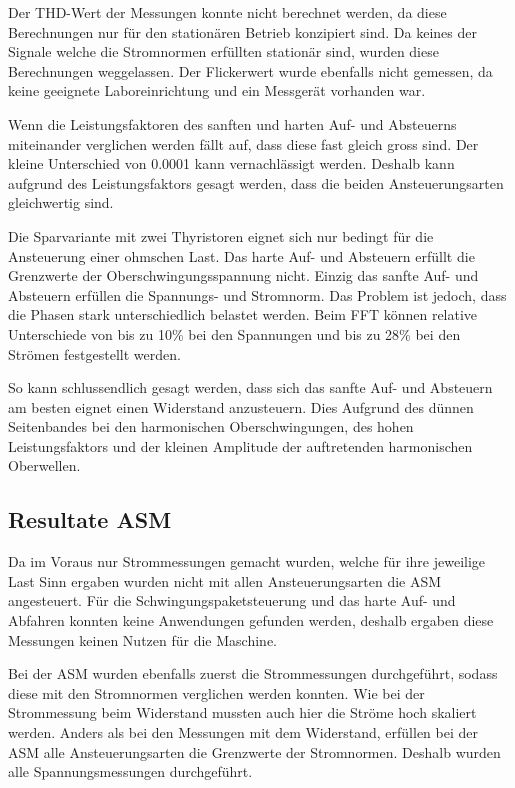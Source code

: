 Der THD-Wert der Messungen konnte nicht berechnet werden, da diese Berechnungen nur für den stationären Betrieb konzipiert sind. Da keines der Signale welche die Stromnormen erfüllten stationär sind, wurden diese Berechnungen weggelassen. Der Flickerwert wurde ebenfalls nicht gemessen, da keine geeignete Laboreinrichtung und ein Messgerät vorhanden war.

Wenn die Leistungsfaktoren des sanften und harten Auf- und Absteuerns miteinander verglichen werden fällt auf, dass diese fast gleich gross sind. Der kleine Unterschied von 0.0001 kann vernachlässigt werden. Deshalb kann aufgrund des Leistungsfaktors gesagt werden, dass die beiden Ansteuerungsarten gleichwertig sind.

Die Sparvariante mit zwei Thyristoren eignet sich nur bedingt für die Ansteuerung einer ohmschen Last. Das harte Auf- und Absteuern erfüllt die Grenzwerte der Oberschwingungsspannung  nicht. Einzig das sanfte Auf- und Absteuern erfüllen die Spannungs- und Stromnorm. Das Problem ist jedoch, dass die Phasen stark unterschiedlich belastet werden. Beim FFT können relative Unterschiede von bis zu 10\% bei den Spannungen und bis zu 28\% bei den Strömen festgestellt werden. 

So kann schlussendlich gesagt werden, dass sich das sanfte Auf- und Absteuern am besten eignet einen Widerstand anzusteuern. Dies Aufgrund des dünnen Seitenbandes bei den harmonischen Oberschwingungen, des hohen Leistungsfaktors und der kleinen Amplitude der auftretenden harmonischen Oberwellen.

\subsection{Resultate ASM}
Da im Voraus nur Strommessungen gemacht wurden, welche für ihre jeweilige Last Sinn ergaben wurden nicht mit allen Ansteuerungsarten die ASM angesteuert. Für die Schwingungspaketsteuerung und das harte Auf- und Abfahren konnten keine Anwendungen gefunden werden, deshalb ergaben diese Messungen keinen Nutzen für die Maschine.

Bei der ASM wurden ebenfalls zuerst die Strommessungen durchgeführt, sodass diese mit den Stromnormen verglichen werden konnten. Wie bei der Strommessung beim Widerstand mussten auch hier die Ströme hoch skaliert werden. Anders als bei den Messungen mit dem Widerstand, erfüllen bei der ASM alle Ansteuerungsarten die Grenzwerte der Stromnormen. Deshalb wurden alle Spannungsmessungen durchgeführt. 

